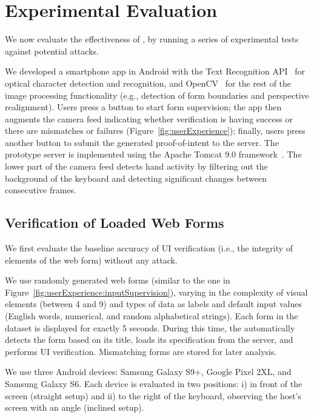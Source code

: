 \section{Experimental Evaluation} 
\label{sec:experimentalEvaluation}

We now evaluate the effectiveness of \sysname, by running a series of experimental tests against potential attacks.

We developed a smartphone app in Android with the Text Recognition API~\cite{googleOCR} for optical character detection and recognition, and OpenCV~\cite{openCV} for the rest of the image processing functionality (e.g., detection of form boundaries and perspective realignment).
Users press a button to start form supervision; the app then augments the camera feed indicating whether verification is having success or there are mismatches or failures (Figure~\ref{fig:userExperience}); finally, users press another button to submit the generated proof-of-intent to the server.  The prototype server is implemented using the Apache Tomcat 9.0 framework~\cite{ApacheTomcat}. The lower part of the camera feed detects hand activity by filtering out the background of the keyboard and detecting significant changes between consecutive frames.

\subsection{Verification of Loaded Web Forms} \label{ssec:UIVerificationEvaluation}

We first evaluate the baseline accuracy of UI verification (i.e., the integrity of elements of the web form) without any attack.


We use \numforms randomly generated web forms (similar to the one in Figure~\ref{fig:userExperience:inputSupervision}), varying in the complexity of visual elements (between 4 and 9) and types of data as labels and default input values (English words, numerical, and random alphabetical strings).
Each form in the dataset is displayed for exactly 5 seconds.
During this time, the \app automatically detects the form based on its title, loads its specification from the server, and performs UI verification.
Mismatching forms are stored for later analysis.

We use three Android devices: Samsung Galaxy S9+, Google Pixel 2XL, and Samsung Galaxy S6. Each device is evaluated in two positions: i) in front of the screen (straight setup) and ii) to the right of the keyboard, observing the host's screen with an angle (inclined setup).

